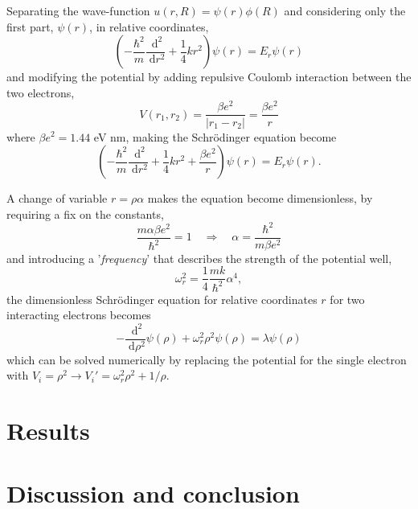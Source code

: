 \documentclass[a4paper,11pt]{article}
\newcommand{\diff}{\ensuremath{\; \text{d}}}
\begin{document}
Separating the wave-function $u(r,R) = \psi(r) \phi(R)$ and considering only the first part, $\psi(r)$, in relative coordinates, 
\[ \left( -\frac{\hbar^2}{m} \frac{\diff^2}{\diff r^2} + \frac{1}{4} kr^2 \right) \psi(r) = E_r \psi(r) \]
and modifying the potential by adding repulsive Coulomb interaction between the two electrons,
\[ V(r_1, r_2) = \frac{\beta e^2}{|r_1 - r_2 |} = \frac{\beta e^2}{r} \]
where $\beta e^2 = 1.44$ eV nm, making the Schr\"{o}dinger equation become
\[ \left( -\frac{\hbar^2}{m} \frac{\diff^2}{\diff r^2} + \frac{1}{4} kr^2 + \frac{\beta e^2}{r} \right) \psi(r) = E_r \psi(r). \]

A change of variable $r =\rho\alpha$ makes the equation become dimensionless, by requiring a fix on the constants,
\[ \frac{m\alpha \beta e^2}{\hbar^2} = 1 \quad \Rightarrow \quad \alpha = \frac{\hbar^2}{m \beta e^2} \]
and introducing a '\textit{frequency}' that describes the strength of the potential well,
\[ \omega_r^2 = \frac{1}{4} \frac{mk}{\hbar^2} \alpha^4, \]
the dimensionless Schr\"{o}dinger equation for relative coordinates $r$ for two interacting electrons becomes
\begin{equation}
    -\frac{\diff^2}{\diff \rho^2} \psi (\rho) + \omega_r^2 \rho^2 \psi(\rho) = \lambda \psi(\rho)
    \label{eq:se_2electrons}
\end{equation}
which can be solved numerically by replacing the potential for the single electron with $V_i = \rho^2 \to V_i' = \omega_r^2 \rho^2 + 1/\rho$. 

\section{Results}

\section{Discussion and conclusion}



\end{document}
